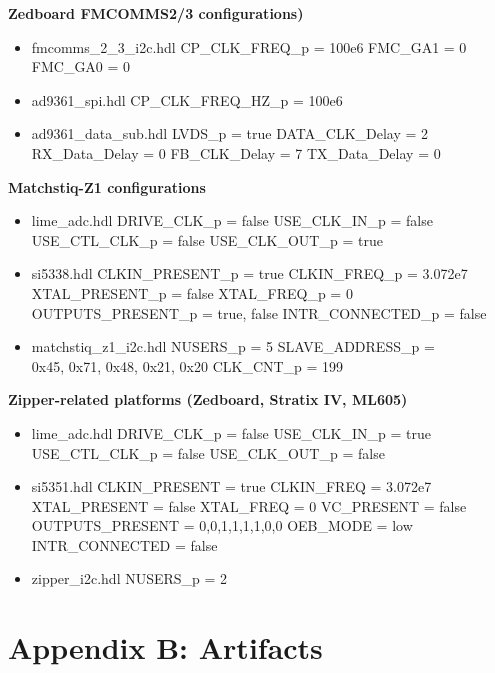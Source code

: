 \begin{minipage}[t]{.5\textwidth}
	\textbf{Zedboard FMCOMMS2/3 configurations)}
	\begin{itemize}
		\item fmcomms\_2\_3\_i2c.hdl
			\subitem CP\_CLK\_FREQ\_p = 100e6
			\subitem FMC\_GA1 = 0
			\subitem FMC\_GA0 = 0
		\item ad9361\_spi.hdl
			\subitem CP\_CLK\_FREQ\_HZ\_p = 100e6
		\item ad9361\_data\_sub.hdl
			\subitem LVDS\_p = true
			\subitem DATA\_CLK\_Delay = 2
			\subitem RX\_Data\_Delay = 0
			\subitem FB\_CLK\_Delay = 7
			\subitem TX\_Data\_Delay = 0
	\end{itemize}
\end{minipage}
	\begin{minipage}[t]{.5\textwidth}
		\textbf{Matchstiq-Z1 configurations}
	\begin{itemize}
		\item lime\_adc.hdl
			\subitem DRIVE\_CLK\_p = false
			\subitem USE\_CLK\_IN\_p = false
			\subitem USE\_CTL\_CLK\_p = false
			\subitem USE\_CLK\_OUT\_p = true
		\item si5338.hdl
			\subitem CLKIN\_PRESENT\_p = true
			\subitem CLKIN\_FREQ\_p = 3.072e7
			\subitem XTAL\_PRESENT\_p = false
			\subitem XTAL\_FREQ\_p = 0
			\subitem OUTPUTS\_PRESENT\_p = true, false
			\subitem INTR\_CONNECTED\_p = false
		\item matchstiq\_z1\_i2c.hdl
			\subitem NUSERS\_p = 5
			\subitem SLAVE\_ADDRESS\_p = \\0x45, 0x71, 0x48, 0x21, 0x20
			\subitem CLK\_CNT\_p = 199
	\end{itemize}
		\textbf{Zipper-related platforms (Zedboard, Stratix IV, ML605)}
	\begin{itemize}
		\item lime\_adc.hdl
			\subitem DRIVE\_CLK\_p = false
			\subitem USE\_CLK\_IN\_p = true
			\subitem USE\_CTL\_CLK\_p = false
			\subitem USE\_CLK\_OUT\_p = false
		\item si5351.hdl
			\subitem CLKIN\_PRESENT = true
			\subitem CLKIN\_FREQ = 3.072e7
			\subitem XTAL\_PRESENT = false
			\subitem XTAL\_FREQ = 0
			\subitem VC\_PRESENT = false
			\subitem OUTPUTS\_PRESENT = 0,0,1,1,1,1,0,0
			\subitem OEB\_MODE = low
			\subitem INTR\_CONNECTED = false
		\item zipper\_i2c.hdl
			\subitem NUSERS\_p = 2
	\end{itemize}
	\end{minipage}
	\pagebreak
\section{Appendix B: Artifacts}
